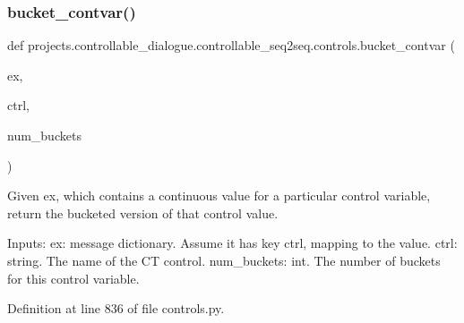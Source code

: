 \subsubsection{\texorpdfstring{bucket\+\_\+contvar()}{bucket\_contvar()}}
{\footnotesize\ttfamily def projects.\+controllable\+\_\+dialogue.\+controllable\+\_\+seq2seq.\+controls.\+bucket\+\_\+contvar (\begin{DoxyParamCaption}\item[{}]{ex,  }\item[{}]{ctrl,  }\item[{}]{num\+\_\+buckets }\end{DoxyParamCaption})}

\begin{DoxyVerb}Given ex, which contains a continuous value for a particular control variable,
return the bucketed version of that control value.

Inputs:
  ex: message dictionary. Assume it has key ctrl, mapping to the value.
  ctrl: string. The name of the CT control.
  num_buckets: int. The number of buckets for this control variable.
\end{DoxyVerb}
 

Definition at line 836 of file controls.\+py.


